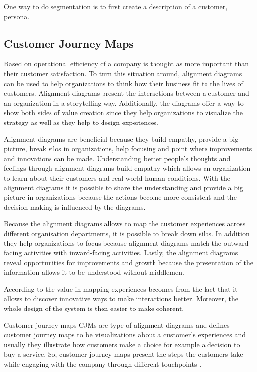One way to do segmentation is to first create a description of a customer, persona.



\subsection{Customer Journey Maps}

Based on \textcite{Kalbach:2016} operational efficiency of a company is thought as more important than their customer satisfaction. To turn this situation around, alignment diagrams can be used to help organizations to think how their business fit to the lives of customers. Alignment diagrams present the interactions between a customer and an organization in a storytelling way. Additionally, the diagrams offer a way to show both sides of value creation since they help organizations to visualize the strategy as well as they help to design experiences. \parencite{Kalbach:2016}

Alignment diagrams are beneficial because they build empathy, provide a big picture, break silos in organizations, help focusing and point where improvements and innovations can be made. Understanding better people's thoughts and feelings through alignment diagrams build empathy which allows an organization to learn about their customers and real-world human conditions. With the alignment diagrams it is possible to share the understanding and provide a big picture in organizations because the actions become more consistent and the decision making is influenced by the diagrams. \parencite{Kalbach:2016}

Because the alignment diagrams allows to map the customer experiences across different organization departments, it is possible to break down silos. In addition they help organizations to focus because alignment diagrams match the outward-facing activities with inward-facing activities. Lastly, the alignment diagrams reveal opportunities for improvements and growth because the presentation of the information allows it to be understood without middlemen. \parencite{Kalbach:2016}

According to \textcite{Kalbach:2016} the value in mapping experiences becomes from the fact that it allows to discover innovative ways to make interactions better. Moreover, the whole design of the system is then easier to make coherent.

Customer journey maps CJMs are type of alignment diagrams and \textcite{Kalbach:2016} defines customer journey maps to be visualizations about a customer's experiences and usually they illustrate how customers make a choice for example a decision to buy a service. So, customer journey maps present the steps the customers take while engaging with the company through different touchpoints \parencite{Richardson:2010}.

